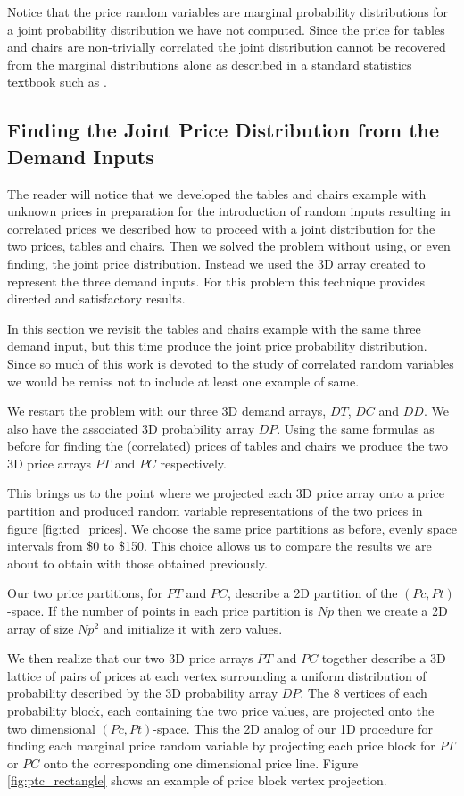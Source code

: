 Notice that the price random variables are marginal probability
distributions for a joint probability distribution we have not
computed. Since the price for tables and chairs are non-trivially
correlated the joint distribution cannot be recovered from the
marginal distributions alone as described in a standard statistics
textbook such as \cite{bickel01}. 

\subsection{Finding the Joint Price Distribution from the Demand Inputs}

The reader will notice that we developed the tables and chairs example
with unknown prices in preparation for the introduction of random
inputs resulting in correlated prices we described how to proceed with
a joint distribution for the two prices, tables and chairs. Then we
solved the problem without using, or even finding, the joint price
distribution. Instead we used the 3D array created to represent the
three demand inputs. For this problem this technique provides directed
and satisfactory results.

In this section we revisit the tables and chairs example with the same
three demand input, but this time produce the joint price probability
distribution. Since so much of this work is devoted to the study of
correlated random variables we would be remiss not to include at least
one example of same.

We restart the problem with our three 3D demand arrays, $DT$, $DC$ and
$DD$. We also have the associated 3D probability array $DP$. Using the
same formulas as before for finding the (correlated) prices of tables
and chairs we produce the two 3D price arrays $PT$ and $PC$
respectively. 

This brings us to the point where we projected each 3D price array
onto a price partition and produced random variable representations of
the two prices in figure \ref{fig:tcd_prices}. We choose the same
price partitions as before, evenly space intervals from \$0 to
\$150. This choice allows us to compare the results we are about to
obtain with those obtained previously.

Our two price partitions, for $PT$ and $PC$, describe a 2D partition
of the $(Pc,Pt)$-space. If the number of points in each price
partition is $Np$ then we create a 2D array of size $Np^2$ and
initialize it with zero values.

We then realize that our two 3D price arrays $PT$ and $PC$ together
describe a 3D lattice of pairs of prices at each vertex surrounding a
uniform distribution of probability described by the 3D probability
array $DP$. The 8 vertices of each probability block, each containing the
two price values, are projected onto the two dimensional $(Pc,
Pt)$-space. This the 2D analog of our 1D procedure for finding each marginal
price random variable by projecting each price block for $PT$ or $PC$
onto the corresponding one dimensional price line. Figure
\ref{fig:ptc_rectangle} shows an example of price block vertex
projection. 

